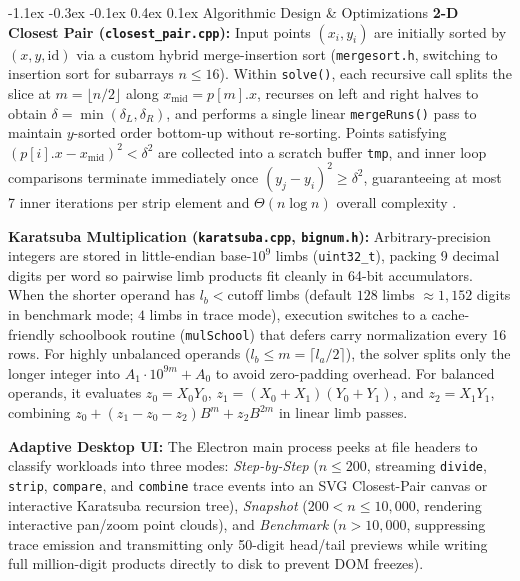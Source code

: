 \documentclass[10pt,twocolumn]{article}
\makeatletter
\renewcommand\subsection{\@startsection{subsection}{2}{\z@}%
  {-1.1ex \@plus -0.3ex \@minus -0.1ex}%
  {0.4ex \@plus 0.1ex}%
  {\normalfont\small\bfseries}}
\makeatother
\begin{document}
\subsection{Algorithmic Design \& Optimizations}
\textbf{2-D Closest Pair (\texttt{closest\_pair.cpp}):} Input points $(x_i, y_i)$ are initially sorted by $(x, y, \text{id})$ via a custom hybrid merge-insertion sort (\texttt{mergesort.h}, switching to insertion sort for subarrays $n \le 16$). Within \texttt{solve()}, each recursive call splits the slice at $m = \lfloor n/2 \rfloor$ along $x_{\text{mid}} = p[m].x$, recurses on left and right halves to obtain $\delta = \min(\delta_L, \delta_R)$, and performs a single linear \texttt{mergeRuns()} pass to maintain $y$-sorted order bottom-up without re-sorting. Points satisfying $(p[i].x - x_{\text{mid}})^2 < \delta^2$ are collected into a scratch buffer \texttt{tmp}, and inner loop comparisons terminate immediately once $(y_j - y_i)^2 \ge \delta^2$, guaranteeing at most 7 inner iterations per strip element and $\Theta(n \log n)$ overall complexity \cite{kleinberg2006algorithm}.

\textbf{Karatsuba Multiplication (\texttt{karatsuba.cpp}, \texttt{bignum.h}):} Arbitrary-precision integers are stored in little-endian base-$10^9$ limbs (\texttt{uint32\_t}), packing 9 decimal digits per word so pairwise limb products fit cleanly in 64-bit accumulators. When the shorter operand has $l_b < \text{cutoff}$ limbs (default $128$ limbs $\approx 1{,}152$ digits in benchmark mode; $4$ limbs in trace mode), execution switches to a cache-friendly schoolbook routine (\texttt{mulSchool}) that defers carry normalization every 16 rows. For highly unbalanced operands ($l_b \le m = \lceil l_a/2 \rceil$), the solver splits only the longer integer into $A_1 \cdot 10^{9m} + A_0$ to avoid zero-padding overhead. For balanced operands, it evaluates $z_0 = X_0 Y_0$, $z_1 = (X_0+X_1)(Y_0+Y_1)$, and $z_2 = X_1 Y_1$, combining $z_0 + (z_1 - z_0 - z_2)B^m + z_2 B^{2m}$ in linear limb passes.

\textbf{Adaptive Desktop UI:} The Electron main process peeks at file headers to classify workloads into three modes: \emph{Step-by-Step} ($n \le 200$, streaming \texttt{divide}, \texttt{strip}, \texttt{compare}, and \texttt{combine} trace events into an SVG Closest-Pair canvas or interactive Karatsuba recursion tree), \emph{Snapshot} ($200 < n \le 10{,}000$, rendering interactive pan/zoom point clouds), and \emph{Benchmark} ($n > 10{,}000$, suppressing trace emission and transmitting only 50-digit head/tail previews while writing full million-digit products directly to disk to prevent DOM freezes).
\end{document}

